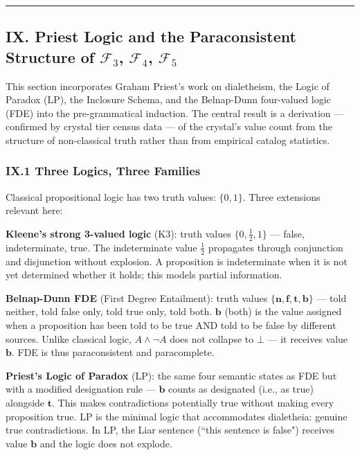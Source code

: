 \documentclass[12pt,a4paper]{article}
\begin{document}
\begin{center}
\rule{0.5\textwidth}{0.4pt}
\end{center}

\subsection{IX. Priest Logic and the Paraconsistent Structure of \texorpdfstring{$\mathcal{F}_3$, $\mathcal{F}_4$, $\mathcal{F}_5$}{F3, F4, F5}}

This section incorporates Graham Priest's work on dialetheism, the Logic of Paradox (LP), the Inclosure Schema, and the Belnap-Dunn four-valued logic (FDE) into the pre-grammatical induction. The central result is a derivation --- confirmed by crystal tier census data --- of the crystal's value count from the structure of non-classical truth rather than from empirical catalog statistics.

\subsubsection{IX.1 Three Logics, Three Families}

Classical propositional logic has two truth values: $\{0, 1\}$. Three extensions relevant here:

\textbf{Kleene's strong 3-valued logic} (K3): truth values $\{0, \frac{1}{2}, 1\}$ --- false, indeterminate, true. The indeterminate value $\frac{1}{2}$ propagates through conjunction and disjunction without explosion. A proposition is indeterminate when it is not yet determined whether it holds; this models partial information.

\textbf{Belnap-Dunn FDE} (First Degree Entailment): truth values $\{\mathbf{n}, \mathbf{f}, \mathbf{t}, \mathbf{b}\}$ --- told neither, told false only, told true only, told both. $\mathbf{b}$ (both) is the value assigned when a proposition has been told to be true AND told to be false by different sources. Unlike classical logic, $A \wedge \neg A$ does not collapse to $\bot$ --- it receives value $\mathbf{b}$. FDE is thus paraconsistent and paracomplete.

\textbf{Priest's Logic of Paradox} (LP): the same four semantic states as FDE but with a modified designation rule --- $\mathbf{b}$ counts as designated (i.e., as true) alongside $\mathbf{t}$. This makes contradictions potentially true without making every proposition true. LP is the minimal logic that accommodates dialetheia: genuine true contradictions. In LP, the Liar sentence (``this sentence is false") receives value $\mathbf{b}$ and the logic does not explode.
\end{document}
